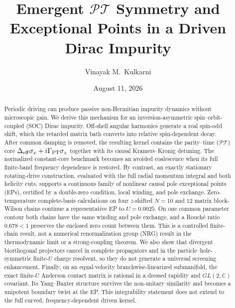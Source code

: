\documentclass[%
  aps,prb,reprint,amsmath,amssymb,superscriptaddress,longbibliography,floatfix
]{revtex4-2}
\newcommand{\PT}{\mathcal{PT}}
\begin{document}
\title{Emergent $\PT$ Symmetry and Exceptional Points
       in a Driven Dirac Impurity}

\author{Vinayak M.~Kulkarni}

\date{August 11, 2026}

\begin{abstract}
Periodic driving can produce passive non-Hermitian impurity dynamics without
microscopic gain.  We derive this mechanism for an inversion-asymmetric
spin--orbit-coupled (SOC) Dirac impurity.  Off-shell angular harmonics generate a
real spin-odd shift, which the retarded matrix bath converts into relative
spin-dependent decay.  After common damping is removed, the resulting kernel
contains the parity--time ($\PT$) core
$\Delta_{\rm eff}\sigma_x+i\Gamma_{\rm PT}\sigma_z$ together with its causal
Kramers--Kronig detuning.  The normalized constant-core benchmark becomes an
avoided coalescence when its full finite-band frequency dependence is
restored.  By contrast, an exactly stationary rotating-drive construction,
evaluated with the full radial momentum integral and both helicity cuts,
supports a continuous family of nonlinear causal pole exceptional points
(EPs), certified by a double-zero condition, local winding, and pole
exchange.  Zero-temperature complete-basis calculations on four
$z$-shifted $N=10$ and $12$ matrix block-Wilson chains continue a
representative EP to $U=0.0025$.  On one common parameter contour both
chains have the same winding and pole exchange, and a Rouch\'e ratio
$0.678<1$ preserves the enclosed zero count between them.  This is a
controlled finite-chain result, not a numerical renormalization group (NRG)
result in the thermodynamic limit or a strong-coupling theorem.  We also show that divergent
biorthogonal projectors cancel in complete propagators and in the
particle--hole-symmetric finite-$U$ charge resolvent, so they do not generate
a universal screening enhancement.  Finally, on an equal-velocity
branchwise-linearized submanifold, the exact finite-$U$ Anderson contact
matrix is rational in a dressed rapidity and $GL(2,\mathbb C)$ covariant.
Its Yang--Baxter structure survives the non-unitary similarity and becomes a
unipotent boundary twist at the EP.  This integrability statement does not
extend to the full curved, frequency-dependent driven kernel.
\end{abstract}

\maketitle
\end{document}
